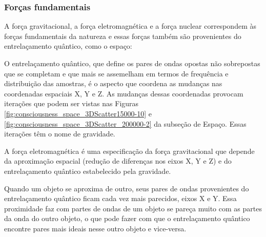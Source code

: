 \subsubsection{Forças fundamentais}
A força gravitacional, a força eletromagnética e a força nuclear correspondem às forças fundamentais da natureza e essas forças também são provenientes do entrelaçamento quântico, como o espaço:

O entrelaçamento quântico, que define os pares de ondas opostas não sobrepostas que se completam e que mais se assemelham em termos de frequência e distribuição das amostras, é o aspecto que coordena as mudanças nas coordenadas espaciais X, Y e Z. As mudanças dessas coordenadas provocam iterações que podem ser vistas nas Figuras \ref{fig:consciousness_space_3DScatter15000-10} e \ref{fig:consciousness_space_3DScatter_200000-2} da subseção de Espaço. Essas iterações têm o nome de gravidade.

A força eletromagnética é uma especificação da força gravitacional que depende da aproximação espacial (redução de diferenças nos eixos X, Y e Z) e do entrelaçamento quântico estabelecido pela gravidade.

Quando um objeto se aproxima de outro, seus pares de ondas provenientes do entrelaçamento quântico ficam cada vez mais parecidos, eixos X e Y. Essa proximidade faz com partes de ondas de um objeto se pareça muito com as partes da onda do outro objeto, o que pode fazer com que o entrelaçamento quântico encontre pares mais ideais nesse outro objeto e vice-versa.  

